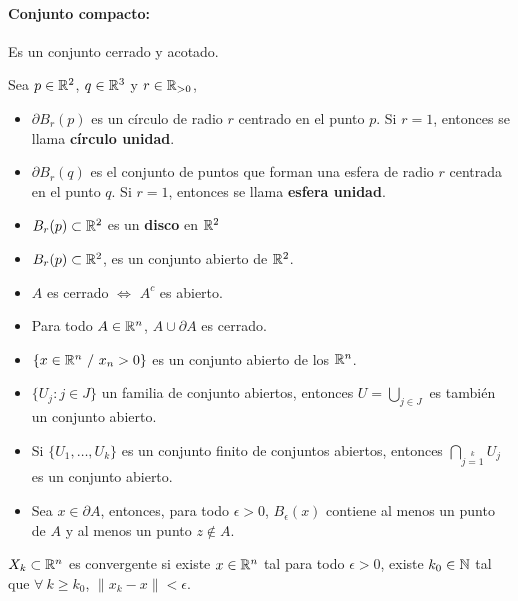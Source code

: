 \paragraph{Conjunto compacto: } Es un conjunto cerrado y acotado.

Sea $p\in\mathbb{R}^2$, $q\in\mathbb{R}^3$ y $r\in\mathbb{R}_{>0}$,
\begin{itemize}
\item $\partial B_r(p)$ es un círculo de radio $r$ centrado en el punto $p$. Si $r=1$, entonces se llama \textbf{círculo unidad}.
\item $\partial B_r(q)$ es el conjunto de puntos que forman una esfera de radio $r$ centrada en el punto $q$. Si $r=1$, entonces se llama \textbf{esfera unidad}.
\item $B_r(p)\subset\mathbb{R}^2$ es un \textbf{disco} en $\mathbb{R}^2$
\item $B_r(p)\subset\mathbb{R}^2$, es un conjunto abierto de $\mathbb{R}^2$.
\item $A$ es cerrado $\iff$ $A^c$ es abierto.
\item Para todo $A\in\mathbb{R}^n$, $A\cup\partial A$ es cerrado.
\item $\{x\in\mathbb{R}^n~/~x_n > 0\}$ es un conjunto abierto de los $\mathbb{R}^n$.
\item $\{ U_j : j\in J\}$ un familia de conjunto abiertos, entonces $U = \bigcup_{j\in J}\limits$ es también un conjunto abierto.
\item Si $\{U_1,\dots,U_k\}$ es un conjunto finito de conjuntos abiertos, entonces $\bigcap_{j=1}\limits^k\limits U_j$ es un conjunto abierto.
\item Sea $x\in\partial A$, entonces, para todo $\epsilon>0$, $B_\epsilon(x)$ contiene al menos un punto de $A$ y al menos un punto $z\notin A$.
\end{itemize}

$X_k\subset\mathbb{R}^n$ es convergente si existe $x\in\mathbb{R}^n$ tal para todo $\epsilon >0$, existe $k_0\in\mathbb{N}$ tal que $\forall~ k\geq k_0$, $\|x_k - x\| < \epsilon$.

